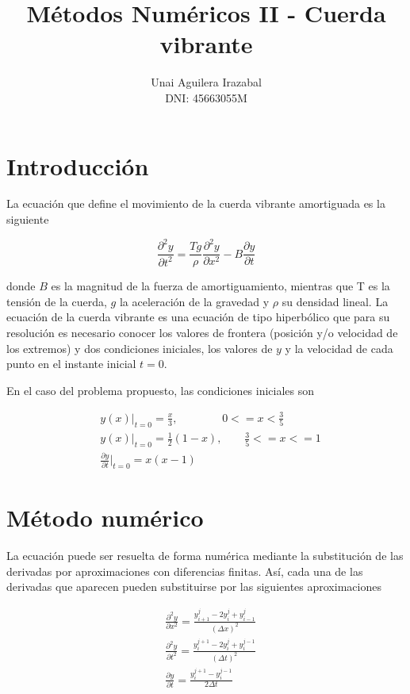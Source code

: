\documentclass[11pt]{article}
\title{Métodos Numéricos II - Cuerda vibrante}
\author{Unai Aguilera Irazabal\\ DNI: 45663055M}
\begin{document}
\maketitle
\tableofcontents

\section{Introducción}
La ecuación que define el movimiento de la cuerda vibrante amortiguada es la siguiente

\begin{equation}
\frac{\partial^2 y}{\partial{t^2}} = \frac{Tg}{\rho}\frac{\partial^2 y}{\partial{x^2}} 
	- B\frac{\partial y}{\partial{t}}
\label{eq:cuerda}
\end{equation}

donde $B$ es la magnitud de la fuerza de amortiguamiento, mientras que T es la tensión de
la cuerda, $g$ la aceleración de la gravedad y $\rho$ su densidad lineal. 
La ecuación de la cuerda vibrante es una ecuación de tipo hiperbólico que para su resolución
es necesario conocer los valores de frontera (posición y/o velocidad de los extremos) y
dos condiciones iniciales, los valores de $y$ y la velocidad de cada punto en el instante
inicial $t=0$.

En el caso del problema propuesto, las condiciones iniciales son

\begin{subequations}
\begin{flalign}
	&y(x)|_{t=0} = \frac{x}{3},~~~~~~~~~~~~~~~~~~ 0 <= x < \frac{3}{5}\\
	&y(x)|_{t=0} = \frac{1}{2}(1 - x),~~~~~~~~~ \frac{3}{5} <= x <= 1\\
	&\frac{\partial{y}}{\partial{t}}|_{t=0} = x(x-1)
\end{flalign}
\label{eq:condiciones_iniciales}
\end{subequations}

\section{Método numérico}
La ecuación puede ser resuelta de forma numérica mediante la substitución de las derivadas
por aproximaciones con diferencias finitas. Así, cada una de las derivadas que aparecen
pueden substituirse por las siguientes aproximaciones

\begin{subequations}
\begin{flalign}
	&\frac{\partial^2 y}{\partial{x^2}} = \frac{y^j_{i+1} - 2y^j_i + y^j_{i-1}}{(\Delta{x})^2}\\
	&\frac{\partial^2 y}{\partial{t^2}} = \frac{y^{j+1}_i - 2y^j_i + y^{j-1}_i}{(\Delta{t})^2}\\
	&\frac{\partial{y}}{\partial{t}} = \frac{y^{j+1}_i - y^{j-1}_i}{2\Delta{t}}
\end{flalign}
\end{subequations}
\end{document}
